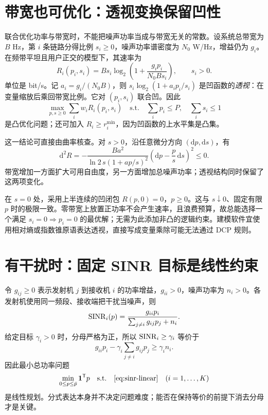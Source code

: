 \section{带宽也可优化：透视变换保留凹性}
联合优化功率与带宽时，不能把噪声功率当成与带宽无关的常数。设系统总带宽为 $B$ Hz，第 $i$ 条链路分得比例 $s_i\geq0$，噪声功率谱密度为 $N_0$ W/Hz，增益仍为 $g_i$。在频带平坦且用户正交的模型下，其速率为
\begin{equation}
 R_i(p_i,s_i)=B s_i\log_2\left(1+\frac{g_i p_i}{N_0 B s_i}\right),\qquad s_i>0.
 \label{eq:bandwidth-rate}
\end{equation}
单位是 bit/s。记 $a_i=g_i/(N_0B)$，则 $s_i\log_2(1+a_i p_i/s_i)$ 是凹函数的\emph{透视}：在变量缩放后乘回带宽比例。它对 $(p_i,s_i)$ 联合凹\cite{boyd2004}。因此
\begin{equation}
 \max_{p,s\geq0}\sum_i w_iR_i(p_i,s_i)
 \quad\text{s.t.}\quad \sum_i p_i\leq P,\quad\sum_i s_i\leq1
 \label{eq:power-bandwidth}
\end{equation}
是凸优化问题；还可加入 $R_i\geq r_i^{\min}$，因为凹函数的上水平集是凸集。

这一结论可直接由曲率核查。对 $s>0$，沿任意微分方向 $(\mathrm dp,\mathrm ds)$，有
\begin{equation}
 \mathrm d^2 R=-\frac{B a^2}{\ln2\,s(1+ap/s)^2}
 \left(\mathrm dp-\frac p s\,\mathrm ds\right)^2\leq0.
\end{equation}
带宽增加一方面扩大可用自由度，另一方面增加总噪声功率；透视结构同时保留了这两项变化。

在 $s=0$ 处，采用上半连续的凹闭包 $R(p,0)=0$，$p\geq0$。这与 $s\downarrow0$、固定有限 $p$ 时的极限一致。零带宽上放置正功率不会产生速率，且浪费预算，故总能选择一个满足 $s_i=0\Rightarrow p_i=0$ 的最优解；无需为此添加非凸的逻辑约束。建模软件宜使用相对熵或指数锥原语表达透视，直接写成变量乘除可能无法通过 DCP 规则。

\section{有干扰时：固定 SINR 目标是线性约束}
令 $g_{ij}\geq0$ 表示发射机 $j$ 到接收机 $i$ 的功率增益，$g_{ii}>0$，噪声功率为 $n_i>0$。各发射机使用同一频段、接收端把干扰当噪声，则
\begin{equation}
 \operatorname{SINR}_i(p)=\frac{g_{ii}p_i}{\sum_{j\ne i}g_{ij}p_j+n_i}.
 \label{eq:power-sinr}
\end{equation}
给定目标 $\gamma_i>0$ 时，分母严格为正，所以 $\operatorname{SINR}_i\geq\gamma_i$ 等价于
\begin{equation}
 g_{ii}p_i-\gamma_i\sum_{j\ne i}g_{ij}p_j\geq\gamma_i n_i.
 \label{eq:sinr-linear}
\end{equation}
因此最小总功率问题
\begin{equation}
 \min_{0\leq p\leq\bar p}\mathbf 1^\mathsf T p
 \quad\text{s.t.}\quad\eqref{eq:sinr-linear}\quad(i=1,\ldots,K)
 \label{eq:sinr-lp}
\end{equation}
是线性规划。分式表达本身并不决定问题难度；能否在保持等价的前提下消去分母才是关键。

